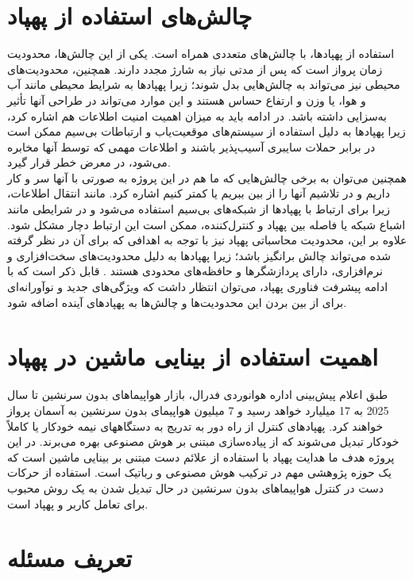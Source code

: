  \section{چالش‌های استفاده از پهپاد}
 استفاده از پهپادها، با چالش‌های متعددی همراه است. یکی از این چالش‌ها، محدودیت زمان پرواز است که پس از مدتی نیاز به شارژ مجدد دارند. 
 همچنین، محدودیت‌های محیطی نیز می‌تواند به چالش‌هایی بدل شوند؛ زیرا پهپادها به شرایط محیطی مانند آب و هوا، یا وزن و ارتفاع حساس هستند و این موارد می‌تواند 
 در طراحی آنها تأثیر به‌سزایی داشته باشد. در ادامه باید به میزان اهمیت امنیت اطلاعات هم اشاره کرد، زیرا پهپادها به دلیل استفاده از سیستم‌های موقعیت‌یاب و ارتباطات بی‌سیم ممکن 
 است در برابر حملات سایبری آسیب‌پذیر باشند و اطلاعات مهمی که توسط آنها مخابره می‌شود، در معرض خطر قرار گیرد.
 \\
 همچنین می‌توان به برخی چالش‌هایی که ما هم در این پروژه به صورتی با آنها سر و کار داریم و در تلاشیم آنها را از بین ببریم یا کمتر کنیم اشاره کرد. 
 مانند انتقال اطلاعات، زیرا برای ارتباط با پهپادها از شبکه‌های بی‌سیم استفاده می‌شود و در شرایطی مانند اشباع شبکه یا فاصله بین پهپاد و کنترل‌کننده، ممکن است این ارتباط دچار مشکل شود.
 علاوه بر این، محدودیت محاسباتی پهپاد نیز با توجه به اهدافی که برای آن در نظر گرفته شده می‌تواند چالش برانگیز باشد؛ زیرا پهپادها به دلیل محدودیت‌های سخت‌افزاری و نرم‌افزاری، دارای پردازشگرها و حافظه‌های محدودی هستند \cite{hassanalian2017classifications}.
 قابل ذکر است که با ادامه پیشرفت فناوری پهپاد، می‌توان انتظار داشت که ویژگی‌های جدید و نوآورانه‌ای برای از بین بردن این محدودیت‌ها و چالش‌ها به‌ پهپادهای آینده اضافه شود.

 \section{اهمیت استفاده از بینایی ماشین در پهپاد}
 طبق اعلام پیش‌بینی اداره هوانوردی فدرال، بازار هواپیماهای بدون سرنشین تا سال 2025 به 17 میلیارد خواهد رسید و 7 میلیون هواپیمای بدون سرنشین به آسمان پرواز خواهند‌ کرد. پهپادهای کنترل
 از راه دور به تدریج به دستگاههای نیمه خودکار یا کاملاً خودکار تبدیل می‌شوند که از پیاده‌سازی مبتنی بر هوش مصنوعی بهره می‌برند. 
 در این پروژه هدف ما هدایت پهپاد با استفاده از علائم دست مبتنی بر بینایی ماشین است که یک حوزه پژوهشی مهم در ترکیب هوش مصنوعی و رباتیک است. 
 استفاده از حرکات دست در کنترل هواپیماهای بدون سرنشین در حال تبدیل شدن به یک روش محبوب برای تعامل کاربر و پهپاد است. 
 

\section{تعریف مسئله}

